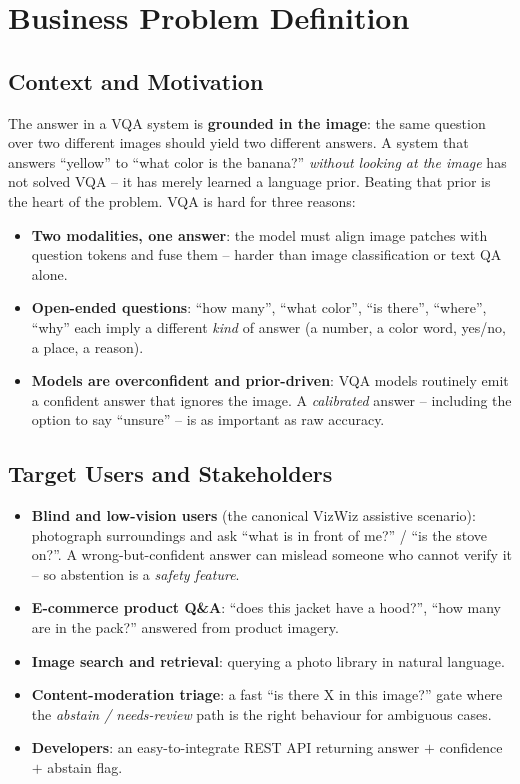 \documentclass[12pt,a4paper]{article}
\begin{document}
\section{Business Problem Definition}

\subsection{Context and Motivation}

The answer in a VQA system is \textbf{grounded in the image}: the same question over two different images should yield two different answers. A system that answers ``yellow'' to ``what color is the banana?'' \emph{without looking at the image} has not solved VQA -- it has merely learned a language prior. Beating that prior is the heart of the problem. VQA is hard for three reasons:
\begin{itemize}
  \item \textbf{Two modalities, one answer}: the model must align image patches with question tokens and fuse them -- harder than image classification or text QA alone.
  \item \textbf{Open-ended questions}: ``how many'', ``what color'', ``is there'', ``where'', ``why'' each imply a different \emph{kind} of answer (a number, a color word, yes/no, a place, a reason).
  \item \textbf{Models are overconfident and prior-driven}: VQA models routinely emit a confident answer that ignores the image. A \emph{calibrated} answer -- including the option to say ``unsure'' -- is as important as raw accuracy.
\end{itemize}

\subsection{Target Users and Stakeholders}

\begin{itemize}
  \item \textbf{Blind and low-vision users} (the canonical VizWiz assistive scenario): photograph surroundings and ask ``what is in front of me?'' / ``is the stove on?''. A wrong-but-confident answer can mislead someone who cannot verify it -- so abstention is a \emph{safety feature}.
  \item \textbf{E-commerce product Q\&A}: ``does this jacket have a hood?'', ``how many are in the pack?'' answered from product imagery.
  \item \textbf{Image search and retrieval}: querying a photo library in natural language.
  \item \textbf{Content-moderation triage}: a fast ``is there X in this image?'' gate where the \emph{abstain / needs-review} path is the right behaviour for ambiguous cases.
  \item \textbf{Developers}: an easy-to-integrate REST API returning answer $+$ confidence $+$ abstain flag.
\end{itemize}
\end{document}
